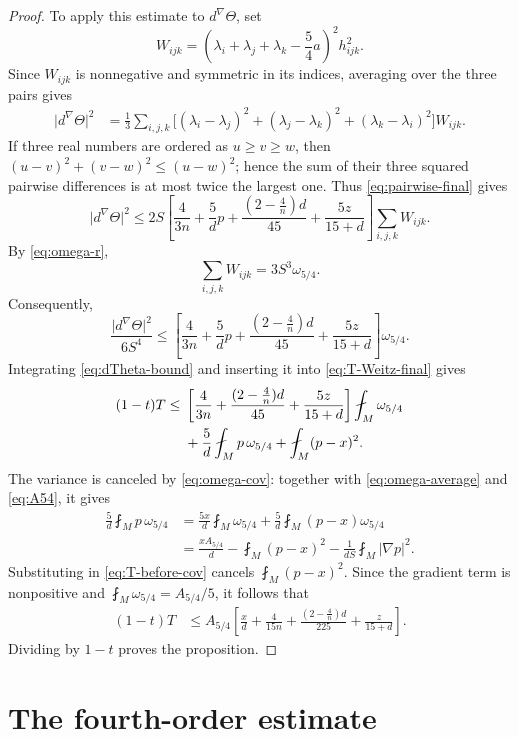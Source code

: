 \documentclass[10pt,a4paper]{amsart}
\numberwithin{equation}{section}
\newcommand{\norm}[1]{\lvert #1\rvert}
\begin{document}
\begin{proof}
To apply this estimate to $d^\nabla\Theta$, set
\[
W_{ijk}=\left(\lambda_i+\lambda_j+\lambda_k-\frac54a\right)^2h_{ijk}^2.
\]
Since $W_{ijk}$ is nonnegative and symmetric in its indices, averaging over the three pairs gives
\begin{align*}
\norm{d^\nabla\Theta}^2
&=\frac13\sum_{i,j,k}
\bigl[(\lambda_i-\lambda_j)^2+(\lambda_j-\lambda_k)^2
+(\lambda_k-\lambda_i)^2\bigr]W_{ijk}.
\end{align*}
If three real numbers are ordered as $u\ge v\ge w$, then
$(u-v)^2+(v-w)^2\le(u-w)^2$; hence the sum of their three squared pairwise differences is at most twice the largest one. Thus \eqref{eq:pairwise-final} gives
\[
\norm{d^\nabla\Theta}^2
\le
2S\left[
\frac4{3n}+\frac5d p
+\frac{(2-\frac4n)d}{45}
+\frac{5z}{15+d}
\right]
\sum_{i,j,k}W_{ijk}.
\]
By \eqref{eq:omega-r},
\[
\sum_{i,j,k}W_{ijk}=3S^3\omega_{5/4}.
\]
Consequently,
\begin{equation}\label{eq:dTheta-bound}
\frac{\norm{d^\nabla\Theta}^2}{6S^4}
\le
\left[
\frac4{3n}+\frac5d p
+\frac{(2-\frac4n)d}{45}
+\frac{5z}{15+d}
\right]\omega_{5/4}.
\end{equation}
Integrating \eqref{eq:dTheta-bound} and inserting it into \eqref{eq:T-Weitz-final} gives
\begin{align}
(1-t)T
\le{}&
\left[
\frac4{3n}
+\frac{(2-\frac4n)d}{45}
+\frac{5z}{15+d}
\right]\fint_M\omega_{5/4}\notag\\
&+\frac5d\fint_Mp\,\omega_{5/4}
+\fint_M(p-x)^2.
\label{eq:T-before-cov}
\end{align}
The variance is canceled by \eqref{eq:omega-cov}: together with \eqref{eq:omega-average} and \eqref{eq:A54}, it gives
\begin{align*}
\frac5d\fint_Mp\,\omega_{5/4}
&=\frac{5x}{d}\fint_M\omega_{5/4}
+\frac5d\fint_M(p-x)\omega_{5/4}\\
&=\frac{xA_{5/4}}d-\fint_M(p-x)^2
-\frac1{dS}\fint_M\norm{\nabla p}^2.
\end{align*}
Substituting in \eqref{eq:T-before-cov} cancels $\fint_M(p-x)^2$. Since the gradient term is nonpositive and $\fint_M\omega_{5/4}=A_{5/4}/5$, it follows that
\begin{align*}
(1-t)T
&\le A_{5/4}\left[
\frac xd+\frac4{15n}
+\frac{(2-\frac4n)d}{225}
+\frac z{15+d}\right].
\end{align*}
Dividing by $1-t$ proves the proposition.
\end{proof}

\section{The fourth-order estimate}\label{sec:fourth}
\end{document}
